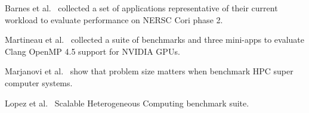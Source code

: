 \documentclass[../document.tex]{subfiles}
\begin{document}
\label{sec:related_work}

Barnes et al.~\cite{barnes2016evaluating} collected a set of applications representative of their current workload to evaluate performance on NERSC Cori phase 2.

Martineau et al.~\cite{martineau2016performance} collected a suite of benchmarks and three mini-apps to evaluate Clang OpenMP 4.5 support for NVIDIA GPUs.

Marjanovi et al.~\cite{marjanovic2016hpc} show that problem size matters when benchmark HPC super computer systems.

Lopez et al.~\cite{lopez2015examining} Scalable Heterogeneous Computing benchmark suite.
\end{document}
